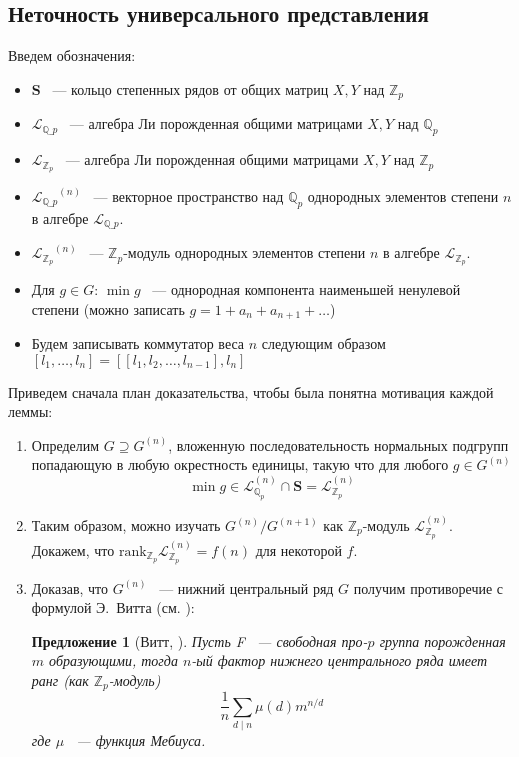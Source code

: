 \documentclass[12pt,a4paper]{article}
\newtheorem{proposition}{Предложение}[section]
\newcommand{\Z}{\ensuremath{\mathbb{Z}}}
\newcommand{\Q}{\ensuremath{\mathbb{Q}}}
\newcommand{\LQ}{\ensuremath{\mathcal{L}_{\mathbb{Q}\_p}}}
\newcommand{\LZ}{\ensuremath{\mathcal{L}_{\mathbb{Z}_p}}}
\newcommand{\LQn}{\ensuremath{\mathcal{L}^{(n)}_{\mathbb{Q}_p}}}
\newcommand{\LZn}{\ensuremath{\mathcal{L}^{(n)}_{\mathbb{Z}_p}}}
\newcommand{\Sbf}{\ensuremath{\mathbf{S}}}
\newcommand{\rank}{\ensuremath{\mathrm{rank}}}
\begin{document}
    \subsection{Неточность универсального представления}
    Введем обозначения:
    \begin{itemize}
        \item $\mathbf{S}$ ~--- кольцо степенных рядов от общих матриц $X, Y$ над $\Z_p$
        \item $\LQ$ ~--- алгебра Ли порожденная общими матрицами $X, Y$ над $\Q_p$
        \item $\LZ$ ~--- алгебра Ли порожденная общими матрицами $X, Y$ над $\Z_p$
        \item $\LQ^{(n)}$ ~--- векторное пространство над $\Q_p$ однородных элементов степени $n$ в алгебре $\LQ$.
        \item $\LZ^{(n)}$ ~---  $\Z_p$-модуль однородных элементов степени $n$ в алгебре $\LZ$.
        \item Для $g\in G$: $\min{g}$ ~--- однородная компонента наименьшей ненулевой степени (можно записать $g=1 + a_n + a_{n+1} + \ldots$)
        \item Будем записывать коммутатор веса $n$ следующим образом $[l_1, \ldots, l_n] = [[l_1, l_2, \ldots, l_{n-1}], l_n]$
    \end{itemize}
    Приведем сначала план доказательства, чтобы была понятна мотивация каждой леммы:
    \begin{enumerate}
        \item Определим $G\supseteq G^{(n)}$, вложенную последовательность нормальных подгрупп попадающую в любую окрестность единицы, такую что для любого $g\in G^{(n)}$
        \[
            \min{g} \in \LQn\cap\Sbf = \LZn
        \]
        \item Таким образом, можно изучать $G^{(n)}/G^{(n+1)}$ как $\Z_p$-модуль $\LZn$.
        Докажем, что $\rank_{\Z_p}{\LZn} = f(n)$ для некоторой $f$.
        \item Доказав, что $G^{(n)}$ ~--- нижний центральный ряд $G$ получим противоречие с формулой Э.\ Витта (см. \cite{Lubotzky}):
        \begin{proposition}[Витт, \cite{Lubotzky}]
            \label{thm:Vitt}
            Пусть F ~--- свободная про-$p$ группа порожденная $m$ образующими, тогда $n$-ый фактор нижнего центрального ряда имеет ранг (как $\Z_p$-модуль)
            \[
                \frac{1}{n}\sum\limits_{d\mid n} \mu(d) m^{n / d}
            \]
            где $\mu$ ~--- функция Мебиуса.
        \end{proposition}
    \end{enumerate}
\end{document}
